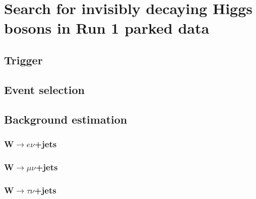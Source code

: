 \chapter{Search for invisibly decaying Higgs bosons in Run 1 parked data}
\label{chap:parked}


\section{Trigger}%
\label{sec:parkedtrigger}

\section{Event selection}%
\label{sec:parkedsel}

\section{Background estimation}%
\label{sec:parkedbkg}

\subsection{W$\rightarrow e\nu$+jets}%
\label{sec:parkedwenu}

\subsection{W$\rightarrow \mu\nu$+jets}%
\label{sec:parkedwmunu}

\subsection{W$\rightarrow \tau\nu$+jets}%
\label{sec:parkedwtaunu}


